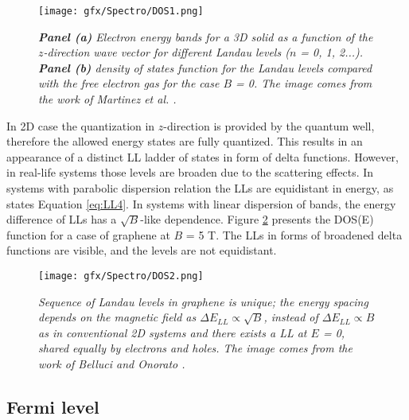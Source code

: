 \documentclass[titlepage,a4paper]{book}
\newcommand{\wciecie}{\quad\phantom{v}}
\begin{document}
\begin{figure}[ht]
	\centering
	\texttt{[image: gfx/Spectro/DOS1.png]}
	\vspace{-10pt}
	\caption{\textit{\textbf{Panel (a)} Electron energy bands for a 3D solid as a function of the $z$-direction wave vector for different Landau levels ($n$ = 0, 1, 2...). \textbf{Panel (b)} density of states function for the Landau levels compared with the free electron gas for the case $B$ = 0. The image comes from the work of Martinez \textit{et al.} \cite{Martinez_Nanotechnology}.}}
	\label{fig:DOS1}
\end{figure}

In 2D case the quantization in $z$-direction is provided by the quantum well, therefore the allowed energy states are fully quantized. This results in an appearance of a distinct LL ladder of states in form of delta functions. However, in real-life systems those levels are broaden due to the scattering effects. In systems with parabolic dispersion relation the LLs are equidistant in energy, as states Equation \ref{eq:LL4}. In systems with linear dispersion of bands, the energy difference of LLs has a $\sqrt{B}$-like dependence. Figure \ref{fig:DOS2} presents the DOS(E) function for a case of graphene at $B$ = 5 T. The LLs in forms of broadened delta functions are visible, and the levels are not equidistant. 

\begin{figure}[H]
	\centering
	\texttt{[image: gfx/Spectro/DOS2.png]}
	\vspace{-10pt}
	\caption{\textit{Sequence of Landau levels in graphene is unique; the energy spacing depends on the magnetic field as $\Delta E_{LL} \propto \sqrt{B}$, instead of $\Delta E_{LL} \propto B$ as in conventional 2D systems and there exists a LL at $E$ = 0, shared equally by electrons and holes. The image comes from the work of Belluci and Onorato \cite{Belluci_DOS}.}}
	\label{fig:DOS2}
\end{figure}

\subsection{Fermi level}
\label{section:Fermi_level}
\wciecie
\end{document}
